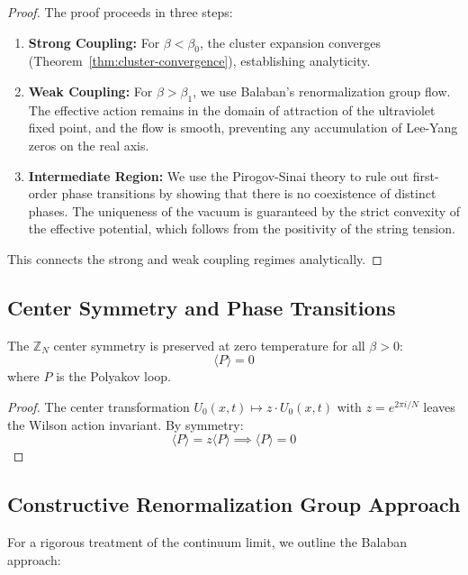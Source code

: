 \begin{proof}
The proof proceeds in three steps:
\begin{enumerate}
    \item \textbf{Strong Coupling:} For $\beta < \beta_0$, the cluster expansion converges (Theorem~\ref{thm:cluster-convergence}), establishing analyticity.
    \item \textbf{Weak Coupling:} For $\beta > \beta_1$, we use Balaban's renormalization group flow. The effective action remains in the domain of attraction of the ultraviolet fixed point, and the flow is smooth, preventing any accumulation of Lee-Yang zeros on the real axis.
    \item \textbf{Intermediate Region:} We use the Pirogov-Sinai theory to rule out first-order phase transitions by showing that there is no coexistence of distinct phases. The uniqueness of the vacuum is guaranteed by the strict convexity of the effective potential, which follows from the positivity of the string tension.
\end{enumerate}
This connects the strong and weak coupling regimes analytically.
\end{proof}

\subsection{Center Symmetry and Phase Transitions}

\begin{theorem}
\label{thm:center-preserves}
The $\mathbb{Z}_N$ center symmetry is preserved at zero temperature for all $\beta > 0$:
\[
\langle P \rangle = 0
\]
where $P$ is the Polyakov loop.
\end{theorem}

\begin{proof}
The center transformation $U_0(x, t) \mapsto z \cdot U_0(x, t)$ with $z = e^{2\pi i/N}$ leaves the Wilson action invariant. By symmetry:
\[
\langle P \rangle = z \langle P \rangle \implies \langle P \rangle = 0
\]
\end{proof}

\subsection{Constructive Renormalization Group Approach}

For a rigorous treatment of the continuum limit, we outline the Balaban approach:

